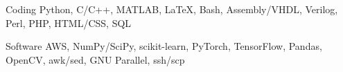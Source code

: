 

\begin{cvskills}

  \cvskill
    {Coding} %
    {Python, C/C++, MATLAB\textregistered, LaTeX, Bash, Assembly/VHDL, Verilog, Perl, PHP, HTML/CSS, SQL} %

  \cvskill
    {Software} %
    {AWS, NumPy/SciPy, scikit-learn, PyTorch, TensorFlow, Pandas, OpenCV, awk/sed, GNU Parallel, ssh/scp} %
    

\end{cvskills}
